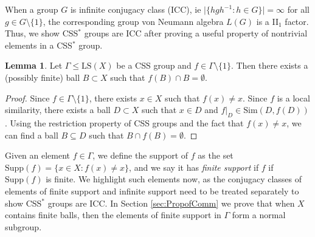 \documentclass[12pt]{amsart}
\numberwithin{equation}{subsection}
\theoremstyle{definition}
\newtheorem{lemma}[theorem]{Lemma}
\theoremstyle{definition}
\theoremstyle{remark}
\newcommand{\supp}{\text{Supp}}
\begin{document}
When a group $G$ is infinite conjugacy class (ICC), ie $\vert\{hgh^{-1}: h \in G \}\vert = \infty$ for all $g \in G \setminus \{1\}$, the corresponding group von Neumann algebra $L(G)$ is a II$_1$ factor. Thus, we show CSS$^*$ groups are ICC after proving a useful property of nontrivial elements in a CSS$^*$ group.


\begin{lemma}\label{lemma:disjointballs}
    Let $\Gamma \leq \text{LS}(X)$ be a CSS group and $f \in \Gamma \setminus \{1\}$. Then there exists a (possibly finite) ball $B \subset X$ such that $f(B) \cap B = \emptyset$. 
\end{lemma}
\begin{proof}
    Since $f \in \Gamma \setminus \{1\}$, there exists $x \in X$ such that $f(x) \neq x$. Since $f$ is a local similarity, there exists a ball $D \subset X$ such that $x \in D$ and $f\vert_D \in \text{Sim}(D,f(D))$. Using the restriction property of CSS groups and the fact that $f(x) \neq x$, we can find a ball $B \subseteq D$ such that $B \cap f(B) = \emptyset$.
\end{proof}

Given an element $f \in \Gamma$, we define the support of $f$ as the set $\supp(f) = \{x\in X : f(x) \neq x \}$, and we say it has \emph{finite support} if $f$ if $\supp(f)$ is finite. We highlight such elements now, as the conjugacy classes of elements of finite support and infinite support need to be treated separately to show CSS$^*$ groups are ICC. In Section \ref{sec:PropofComm} we prove that when $X$ contains finite balls, then the elements of finite support in $\Gamma$ form a normal subgroup. 
\end{document}
